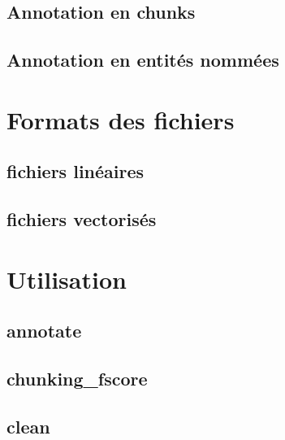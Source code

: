 \documentclass[12pt]{article}
\begin{document}
        \subsection{Annotation en chunks}
        

        \subsection{Annotation en entités nommées}
        

        \subsection{\LeFFFFull}
        
    
    \section{Formats des fichiers}
    

        \subsection{fichiers linéaires}
        

        \subsection{fichiers vectorisés}
        
    
    \section{Utilisation}
    

        \subsection{annotate}
        

        \subsection{chunking\_fscore}
        

        \subsection{clean}
        
\end{document}
